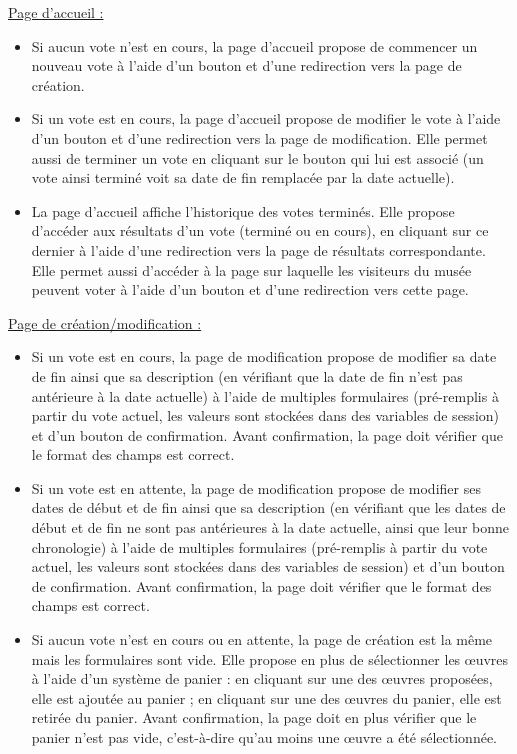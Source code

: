 \documentclass[a4paper]{article}
\begin{document}
\underline{Page d'accueil :}\\
\begin{itemize}
\item Si aucun vote n'est en cours, la page d’accueil propose de commencer un nouveau vote à l'aide d'un bouton et d'une redirection vers la page de création.
\item Si un vote est en cours, la page d’accueil propose de modifier le vote à l'aide d'un bouton et d'une redirection vers la page de modification. Elle permet aussi de terminer un vote en cliquant sur le bouton qui lui est associé (un vote ainsi terminé voit sa date de fin remplacée par la date actuelle).
\item La page d'accueil affiche l'historique des votes terminés. Elle propose d'accéder aux résultats d'un vote (terminé ou en cours), en cliquant sur ce dernier à l'aide d'une redirection vers la page de résultats correspondante. Elle permet aussi d'accéder à la page sur laquelle les visiteurs du musée peuvent voter à l'aide d'un bouton et d'une redirection vers cette page.\\
\end{itemize}

\underline{Page de création/modification :}\\
\begin{itemize}
\item Si un vote est en cours, la page de modification propose de modifier sa date de fin ainsi que sa description (en vérifiant que la date de fin n'est pas antérieure à la date actuelle) à l’aide de multiples formulaires (pré-remplis à partir du vote actuel, les valeurs sont stockées dans des variables de session) et d'un bouton de confirmation. Avant confirmation, la page doit vérifier que le format des champs est correct. %
\item Si un vote est en attente, la page de modification propose de modifier ses dates de début et de fin ainsi que sa description (en vérifiant que les dates de début et de fin ne sont pas antérieures à la date actuelle, ainsi que leur bonne chronologie) à l’aide de multiples formulaires (pré-remplis à partir du vote actuel, les valeurs sont stockées dans des variables de session) et d'un bouton de confirmation. Avant confirmation, la page doit vérifier que le format des champs est correct.
\item Si aucun vote n’est en cours ou en attente, la page de création est la même mais les formulaires sont vide. Elle propose en plus de sélectionner les œuvres à l'aide d'un système de panier : en cliquant sur une des œuvres proposées, elle est ajoutée au panier ; en cliquant sur une des œuvres du panier, elle est retirée du panier. Avant confirmation, la page doit en plus vérifier que le panier n'est pas vide, c'est-à-dire qu'au moins une œuvre a été sélectionnée.\\
\end{itemize}
\end{document}
